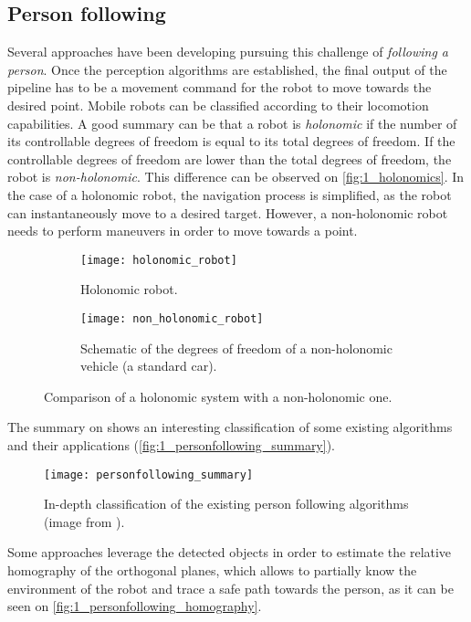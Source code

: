 \subsection{Person following}
Several approaches have been developing pursuing this challenge of \textit{following a person}. Once the perception algorithms are established, the final output of the pipeline has to be a movement command for the robot to move towards the desired point. Mobile  robots can be classified according to their locomotion capabilities. A good summary can be that a robot is \textit{holonomic} if the number of its controllable degrees of freedom is equal to its total degrees of freedom. If the controllable degrees of freedom are lower than the total degrees of freedom, the robot is \textit{non-holonomic}. This difference can be observed on \autoref{fig:1_holonomics}. In the case of a holonomic robot, the navigation process is simplified, as the robot can instantaneously move to a desired target. However, a non-holonomic robot needs to perform maneuvers in order to move towards a point.\\


\begin{figure}[h]
	\centering
	\begin{subfigure}[t]{0.45\linewidth}
		\centering
		\texttt{[image: holonomic\_robot]}
		\caption{Holonomic robot.}
	\end{subfigure}
	\begin{subfigure}[t]{0.45\linewidth}
	\centering
	\texttt{[image: non\_holonomic\_robot]}
	\caption{Schematic of the degrees of freedom of a non-holonomic vehicle (a standard car).}
	\end{subfigure}
	\caption{Comparison of a holonomic system with a non-holonomic one.}
	\label{fig:1_holonomics}
\end{figure}

The summary on \cite{personfollowing_summary} shows an interesting classification of some existing algorithms and their applications (\autoref{fig:1_personfollowing_summary}).


\begin{figure}[h]
	\centering
	\texttt{[image: personfollowing\_summary]}
	\caption{In-depth classification of the existing person following algorithms (image from \cite{personfollowing_summary}).}
	\label{fig:1_personfollowing_summary}
\end{figure}

Some approaches leverage the detected objects in order to estimate the relative homography of the orthogonal planes, which allows to partially know the environment of the robot and trace a safe path towards the person, as it can be seen on \autoref{fig:1_personfollowing_homography}.


